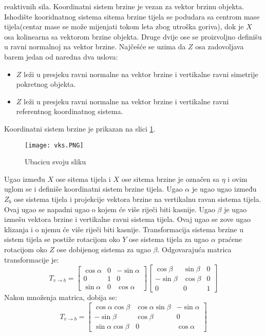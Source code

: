 reaktivnih sila. Koordinatni sistem brzine je vezan za vektor brzinu objekta. Ishodište kooridnatnog sistema 
sitema brzine tijela se podudara sa centrom mase tijela(centar mase se može mijenjati tokom leta zbog utroška goriva), dok 
je $X$ osa kolinearna sa vektorom brzine objekta. Druge dvije ose se proizvoljno definišu u ravni 
normalnoj na vektor brzine. Najčešće se uzima da $Z$ osa zadovoljava barem jedan od naredna dva uslova:
\begin{itemize}
    \item $Z$ leži u presjeku ravni normalne na vektor brzine i vertikalne ravni simetrije pokretnog objekta.
    \item $Z$ leži u presjeku ravni normalne na vektor brzine i vertikalne ravni referentnog koordinatnog sistema.
\end{itemize}
Koordinatni sistem brzine je prikazan na slici \ref{fig:vks}.
\begin{figure}[!ht]
    \centering
    \texttt{[image: vks.PNG]}
    \caption{Ubacicu svoju sliku}
    \label{fig:vks}
\end{figure}
Ugao između $X$ ose sitema tijela i $X$ ose sitema brzine je označen sa $\eta$ i ovim uglom se i definiše 
koordinatni sistem brzine tijela. Ugao $\alpha$ je ugao ugao između $Z_b$ ose  sistema tijela i projekcije 
vektora brzine na vertikalnu ravan sistema tijela. Ovaj ugao se napadni ugao o kojem će više riječi biti kasnije. 
Ugao $\beta$ je ugao izmešu vektora brzine i vertikalne ravni sistema tijela. Ovaj ugao se zove ugao klizanja i o njemu će 
više riječi biti kasnije. Transformacija sistema brzine u sistem tijela se postiže rotacijom 
oko $Y$ ose sistema tijela za ugao $\alpha$ praćene rotacijom oko $Z$ ose dobijenog sistema za ugao $\beta$. 
Odgovarajuća matrica transformacije je:
\begin{equation}
    T_{v\to b} = \begin{bmatrix}
        \cos\alpha & 0 & -\sin\alpha \\
        0& 1& 0\\
        \sin\alpha & 0 & \cos\alpha
    \end{bmatrix}
    \begin{bmatrix}
        \cos\beta & \sin\beta & 0\\
        -\sin\beta & \cos\beta & 0\\
        0 & 0& 1
    \end{bmatrix}
\end{equation}
Nakon množenja matrica, dobija se:
\begin{equation}
    T_{v\to b} = \begin{bmatrix}
        \cos\alpha\cos\beta & \cos\alpha\sin\beta & -\sin\alpha \\
        -\sin\beta & \cos\beta & 0\\
        \sin\alpha\cos\beta & 0 & \cos\alpha
    \end{bmatrix}
    \label{eq:VtoB}
\end{equation}
